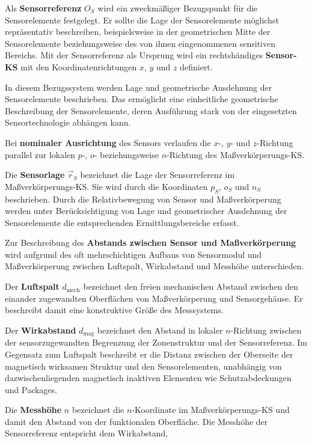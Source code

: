 \documentclass[
  ngerman,
  a4paper,
  twoside]{scrbook}
\begin{document}
Als \textbf{Sensorreferenz} \(O_S\) wird ein zweckmäßiger Bezugspunkt
für die Sensorelemente festgelegt. Er sollte die Lage der Sensorelemente
möglichst repräsentativ beschreiben, beispielsweise in der geometrischen
Mitte der Sensorelemente beziehungsweise des von ihnen eingenommenen
sensitiven Bereichs. Mit der Sensorreferenz als Ursprung wird ein
rechtshändiges \textbf{Sensor-KS} mit den Koordinatenrichtungen \(x\),
\(y\) und \(z\) definiert.

In diesem Bezugssystem werden Lage und geometrische Ausdehnung der
Sensorelemente beschrieben. Das ermöglicht eine einheitliche
geometrische Beschreibung der Sensorelemente, deren Ausführung stark von
der eingesetzten Sensortechnologie abhängen kann.

Bei \textbf{nominaler Ausrichtung} des Sensors verlaufen die \(x\)-,
\(y\)- und \(z\)-Richtung parallel zur lokalen \(p\)-, \(o\)-
beziehungsweise \(n\)-Richtung des Maßverkörperungs-KS.

Die \textbf{Sensorlage} \(\vec{r}_S\) bezeichnet die Lage der
Sensorreferenz im Maßverkörperungs-KS. Sie wird durch die Koordinaten
\(p_S\), \(o_S\) und \(n_S\) beschrieben. Durch die Relativbewegung von
Sensor und Maßverkörperung werden unter Berücksichtigung von Lage und
geometrischer Ausdehnung der Sensorelemente die entsprechenden
Ermittlungsbereiche erfasst.

Zur Beschreibung des \textbf{Abstands zwischen Sensor und
Maßverkörperung} wird aufgrund des oft mehrschichtigen Aufbaus von
Sensormodul und Maßverkörperung zwischen Luftspalt, Wirkabstand und
Messhöhe unterschieden.

Der \textbf{Luftspalt} \(d_\mathrm{mech}\) bezeichnet den freien
mechanischen Abstand zwischen den einander zugewandten Oberflächen von
Maßverkörperung und Sensorgehäuse. Er beschreibt damit eine konstruktive
Größe des Messsystems.

Der \textbf{Wirkabstand} \(d_\mathrm{mag}\) bezeichnet den Abstand in
lokaler \(n\)-Richtung zwischen der sensorzugewandten Begrenzung der
Zonenstruktur und der Sensorreferenz. Im Gegensatz zum Luftspalt
beschreibt er die Distanz zwischen der Oberseite der magnetisch
wirksamen Struktur und den Sensorelementen, unabhängig von
dazwischenliegenden magnetisch inaktiven Elementen wie Schutzabdeckungen
und Packages.

Die \textbf{Messhöhe} \(n\) bezeichnet die \(n\)-Koordinate im
Maßverkörperungs-KS und damit den Abstand von der funktionalen
Oberfläche. Die Messhöhe der Sensorreferenz entspricht dem Wirkabstand,
\end{document}
